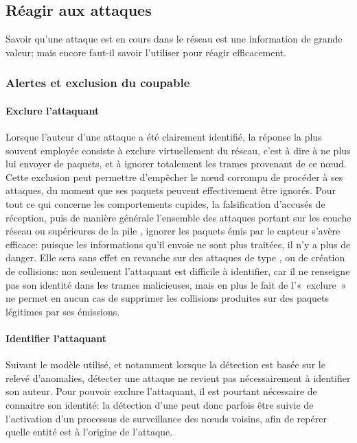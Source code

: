 \subsection{Réagir aux attaques}
Savoir qu'une attaque est en cours dans le réseau est une information de grande valeur; mais encore faut-il savoir l'utiliser pour réagir efficacement.

    \subsubsection{Alertes et exclusion du coupable}
    \paragraph{Exclure l'attaquant}
Lorsque l'auteur d'une attaque a été clairement identifié, la réponse la plus souvent employée consiste à exclure virtuellement du réseau, c'est à dire à ne plus lui envoyer de paquets, et à ignorer totalement les trames provenant de ce nœud.
Cette exclusion peut permettre d'empêcher le nœud corrompu de procéder à ses attaques, du moment que ses paquets peuvent effectivement être ignorés.
Pour tout ce qui concerne les comportements cupides, la falsification d'accusés de réception, puis de manière générale l'ensemble des attaques portant sur les couche réseau ou supérieures de la pile \tcpip, ignorer les paquets émis par le capteur s'avère efficace: puisque les informations qu'il envoie ne sont plus traitées, il n'y a plus de danger.
Elle sera sans effet en revanche sur des attaques de type , ou de création de collisions: non seulement l'attaquant est difficile à identifier, car il ne renseigne pas son identité dans les trames malicieuses, mais en plus le fait de l'« exclure » ne permet en aucun cas de supprimer les collisions produites sur des paquets légitimes par ses émissions.

        \paragraph{Identifier l'attaquant}
Suivant le modèle utilisé, et notamment lorsque la détection est basée sur le relevé d'anomalies, détecter une attaque ne revient pas nécessairement à identifier son auteur.
Pour pouvoir exclure l'attaquant, il est pourtant nécessaire de connaitre son identité: la détection d'une  peut donc parfois être suivie de l'activation d'un processus de surveillance des nœuds voisins, afin de repérer quelle entité est à l'origine de l'attaque.

